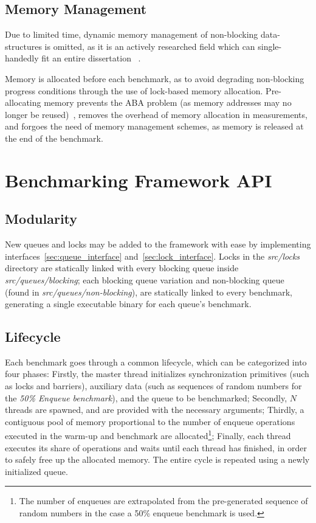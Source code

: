 \subsection{Memory Management}
Due to limited time, dynamic memory management of non-blocking data-structures
is omitted, as it is an actively researched field which can single-handedly fit
an entire dissertation ~\citep{valois1995datastructures,michael2004hazard}.

Memory is allocated before each benchmark, as to avoid degrading
non-blocking progress conditions through the use of lock-based memory
allocation. Pre-allocating memory prevents the ABA problem (as memory addresses
may no longer be reused)~\citep{dechev2010understanding}, removes the overhead
of memory allocation in measurements, and forgoes the need of memory management
schemes, as memory is released at the end of the benchmark.

\section{Benchmarking Framework API}
\subsection{Modularity}
New queues and locks may be added to the framework with ease by implementing
interfaces~\ref{sec:queue_interface} and~\ref{sec:lock_interface}. Locks in the
\emph{src/locks} directory are statically linked with every blocking queue
inside \emph{src/queues/blocking}; each blocking
queue variation and non-blocking queue (found in
\emph{src/queues/non-blocking}), are statically linked to every benchmark,
generating a single executable binary for each queue's benchmark. 

\subsection{Lifecycle}
Each benchmark goes through a common lifecycle, which can be categorized into
four phases: 
Firstly, the master thread initializes synchronization primitives
(such as locks and barriers), auxiliary data (such as
sequences of random numbers for the \emph{50\% Enqueue benchmark}), and the
queue to be benchmarked; 
Secondly, $N$ threads are spawned, and are provided
with the necessary arguments;
Thirdly, a contiguous pool of memory proportional
to the number of enqueue operations executed in the warm-up and benchmark are
allocated\footnote{The number of enqueues are extrapolated from the
pre-generated sequence of random numbers in the case a 50\% enqueue benchmark
is used.};
Finally, each thread executes its share of operations and waits until each
thread has finished, in order to safely free up the allocated memory. The
entire cycle is repeated using a newly initialized queue.

